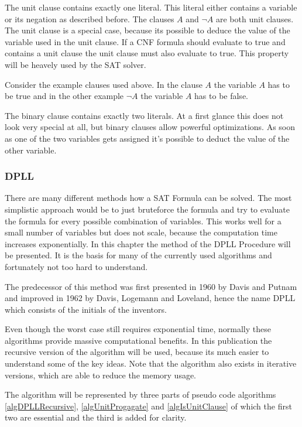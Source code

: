 The unit clause contains exactly one literal. This literal either contains a variable or its negation as described before. 
The clauses $A$ and $\lnot A$ are both unit clauses. 
The unit clause is a special case, because its possible to deduce the value of the variable used in the unit clause.
If a CNF formula should evaluate to true and contains a unit clause the unit clause must also evaluate to true. 
This property will be heavely used by the SAT solver.

Consider the example clauses used above. In the clause $A$ the variable $A$ has to be true and in the other example $\lnot A$ the variable $A$ has to be false.

The binary clause contains exactly two literals. At a first glance this does not look very special at all, but binary clauses allow powerful optimizations. As soon as one of the two variables gets assigned it's possible to deduct the value of the other variable.
\subsubsection{DPLL}

There are many different methods how a SAT Formula can be solved. The most simplistic approach would be to just bruteforce the formula and try to evaluate the formula for every possible combination of variables. This works well for a small number of variables but does not scale, because the computation time increases exponentially. In this chapter the method of the DPLL Procedure will be presented. It is the basis for many of the currently used algorithms and fortunately not too hard to understand.

The predecessor of this method was first presented in 1960 by Davis and Putnam and improved in 1962 by Davis, Logemann and Loveland, hence the name DPLL which consists of the initials of the inventors.

Even though the worst case still requires exponential time, normally these algorithms provide massive computational benefits. In this publication the recursive version of the algorithm will be used, because its much easier to understand some of the key ideas. Note that the algorithm also exists in iterative versions, which are able to reduce the memory usage.

The algorithm will be represented by three parts of pseudo code algorithms \ref{algDPLLRecursive}, \ref{algUnitProgagate} and \ref{algIsUnitClause} of which the first two are essential and the third is added for clarity.

